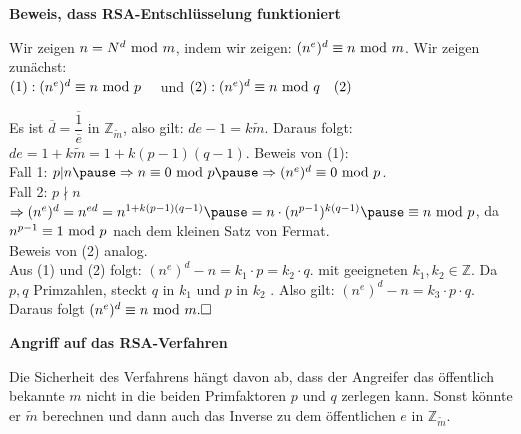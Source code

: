 \begin{frame}[fragile]

\textbf{Beweis, dass RSA-Entschlüsselung funktioniert} \pause

Wir zeigen $n = N^d \text{ mod } m$, indem wir zeigen: $(n^e)^d \equiv n \text{ mod } m$. \pause Wir zeigen
zunächst: \\
$(1): (n^e)^d \equiv n \text{ mod } p \quad  $ und $(2): (n^e)^d \equiv n \text{ mod } q \quad (2)$  \pause

Es ist $\overline{d} = \dfrac{\overline{1}}{\overline{e}}$ in $\mathbb{Z}_{\tilde{m}}$\pause, also gilt: $de - 1 = k \tilde{m}$. \pause Daraus folgt: $de = 1 + k\tilde{m} = 1+k(p-1)(q-1)$. \pause Beweis von (1):  \\ \pause
Fall 1: $p|n \pause \Rightarrow n \equiv 0 \tmod p \pause \Rightarrow (n^e)^d \equiv 0 \tmod p$. \\ \pause
Fall 2: $p \nmid n$ \pause $\Rightarrow (n^e) ^d = n^{ed} = n^{1+k(p-1)(q-1)}\pause = n \cdot (n^{p-1})^{k(q-1)} \pause \equiv n \tmod p$\pause, 
da $n^{p-1}\equiv 1 \text{ mod } p$ nach dem kleinen Satz von Fermat. \pause \\ Beweis von (2) analog. \\ \pause
Aus (1) und (2) folgt: $(n^e)^d - n = k_1 \cdot p = k_2 \cdot q$. mit geeigneten $k_1, k_2 \in \mathbb{Z}$. \pause Da $p, q$ Primzahlen, steckt $q$ in $k_1$ und $p$ in $k_2$ . \pause
Also gilt:  $(n^e)^d - n = k_3 \cdot p \cdot q$. \pause Daraus folgt  $(n^e)^d \equiv n \tmod m. \hfill \square{}$

\end{frame}

\begin{frame}[fragile]

\textbf{Angriff auf das RSA-Verfahren} \pause

Die Sicherheit des Verfahrens hängt davon ab, dass der Angreifer das öffentlich bekannte $m$ nicht in die beiden
Primfaktoren $p$ und $q$ zerlegen kann. \pause Sonst könnte er $\tilde{m}$ berechnen und dann auch das Inverse zu dem öffentlichen $e$ in $\mathbb{Z}_{\tilde{m}}$. 
\end{frame}

